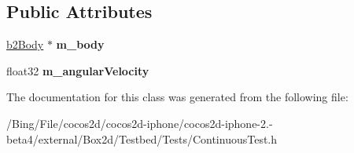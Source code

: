 \subsection*{Public Attributes}
\begin{DoxyCompactItemize}
\item 
\hypertarget{class_continuous_test_a0dc34c00def377a6dbb30647ae49ca4d}{\hyperlink{classb2_body}{b2\-Body} $\ast$ {\bfseries m\-\_\-body}}\label{class_continuous_test_a0dc34c00def377a6dbb30647ae49ca4d}

\item 
\hypertarget{class_continuous_test_ae0e1ed448f67178b3cdc70bbae6904ac}{float32 {\bfseries m\-\_\-angular\-Velocity}}\label{class_continuous_test_ae0e1ed448f67178b3cdc70bbae6904ac}

\end{DoxyCompactItemize}


The documentation for this class was generated from the following file\-:\begin{DoxyCompactItemize}
\item 
/\-Bing/\-File/cocos2d/cocos2d-\/iphone/cocos2d-\/iphone-\/2.-\/beta4/external/\-Box2d/\-Testbed/\-Tests/Continuous\-Test.\-h\end{DoxyCompactItemize}
